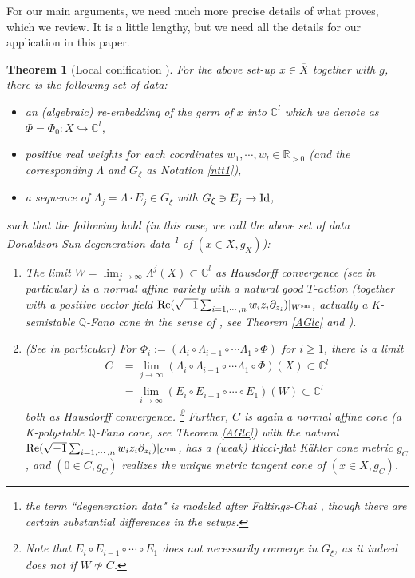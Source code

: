 \documentclass[12pt,a4paper]{amsart}
\newtheorem{Thm}{Theorem}[section]
\theoremstyle{remark}
\theoremstyle{definition}
\def\R{\mathbb{R}}
\def\C{\mathbb{C}}
\def\Q{\mathbb{Q}}
\begin{document}
For our main arguments, 
we need much more precise details of what 
\cite{DSII} proves, 
which we review. It is a little lengthy, but 
we need all the details for our application in this paper. 

\begin{Thm}[Local conification \cite{DSII}]\label{DS.maps}
For the above set-up $x\in \overline{X}$ together with $g$, 
there is the following set of data: 
\begin{itemize}
\item 
an (algebraic) re-embedding of 
the germ of $x$ into $\C^l$ which we denote as $\Phi=\Phi_0\colon X\hookrightarrow \C^l$, 
\item 
positive real weights for each coordinates 
$w_1,\cdots,w_l\in \R_{>0}$ (and the corresponding 
$\Lambda$ and $G_\xi$ as Notation \ref{ntt1}), 
\item a 
sequence of 
    $\Lambda_j=\Lambda\cdot E_j\in G_\xi$ 
with $G_\xi\ni E_j\to {\rm Id}$, 
\end{itemize}
such that the following hold 
(in this case, we call the above set of data 
{\it Donaldson-Sun degeneration data} 
\footnote{the term ``degeneration data" is modeled 
after 
Faltings-Chai \cite[II \S0, III \S2]{FaltingsChai}, though 
there are certain substantial differences in the setups.}
of $(x\in X, g_X)$): 
\begin{enumerate}
    \item \label{DSi} The limit 
    $W=\lim_{j\to \infty}\Lambda^j (X)\subset \C^l$ as 
    Hausdorff convergence (see \cite[\S 3.2]{DSII} in particular) 
    is a normal affine variety with a natural 
    good $T$-action 
    (together with a positive vector field 
    ${\rm Re}(\sqrt{-1}\sum_{i=1,\cdots,n}w_i z_i\partial_{z_i})|_{W^{\rm sm}}$, 
    actually a K-semistable $\Q$-Fano cone 
    in the sense of \cite{CS, CS2}, see Theorem \ref{AGlc} and \cite[\S 2]{Od24a}). 
    \item \label{DSii}
    (See \cite[p.346 \& 3.14]{DSII} in particular) 
    For $\Phi_i:=(\Lambda_i\circ \Lambda_{i-1}\circ \cdots \Lambda_1 \circ \Phi)$ 
    for $i\ge 1$, there is a limit 
    \begin{align*} 
    C&=\lim_{j\to \infty}(\Lambda_i\circ \Lambda_{i-1}\circ \cdots \Lambda_1 \circ \Phi)(X)\subset \C^l\\ 
    &=\lim_{i\to \infty}(E_i\circ E_{i-1}\circ \cdots \circ E_1)(W)\subset \C^l
    \end{align*}
    both as 
    Hausdorff convergence. 
    \footnote{Note that $E_i\circ E_{i-1}\circ \cdots \circ E_1$ does not necessarily converge in $G_\xi$, 
    as it indeed does not if $W\not\simeq C$.} 
    Further, $C$ is again a normal affine cone (a K-polystable $\Q$-Fano cone, see Theorem \ref{AGlc}) 
    with the natural 
    ${\rm Re}(\sqrt{-1}\sum_{i=1,\cdots,n}w_i z_i\partial_{z_i})|_{C^{\rm sm}}$, has a 
    (weak) Ricci-flat K\"ahler cone metric $g_C$,  
    and $(0\in C,g_C)$ realizes the unique metric tangent cone of 
    $(x\in X,g_C)$. 
    

\end{enumerate}
\end{Thm}
\end{document}
